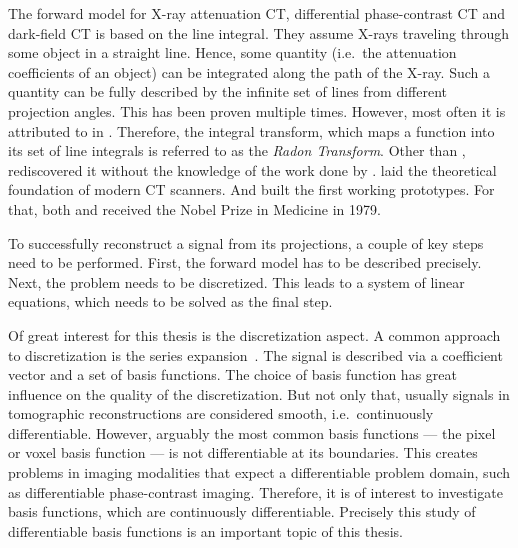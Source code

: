 The forward model for X-ray attenuation CT, differential phase-contrast CT and dark-field CT is
based on the line integral. They assume X-rays traveling through some object in a straight line.
Hence, some quantity (i.e.\ the attenuation coefficients of an object) can be integrated along the
path of the X-ray. Such a quantity can be fully described by the infinite set of lines from
different projection angles. This has been proven multiple times. However, most often it is
attributed to \textcite{radon_uber_1917} in \citeyear{radon_uber_1917}. Therefore, the integral
transform, which maps a function into its set of line integrals is referred to as the \textit{Radon
	Transform}. Other than \citeauthor*{radon_uber_1917}, \textcite*{cormack_representation_1963}
rediscovered it without the knowledge of the work done by \citeauthor*{radon_uber_1917}.
\citeauthor*{cormack_representation_1963} laid the theoretical foundation of modern CT scanners. And
\textcite{hounsfield_computerized_1973} built the first working prototypes. For that, both
\citeauthor*{cormack_representation_1963} and \citeauthor*{hounsfield_computerized_1973} received
the Nobel Prize in Medicine in 1979.

To successfully reconstruct a signal from its projections, a couple of key steps need to be
performed. First, the forward model has to be described precisely. Next, the problem needs to be
discretized. This leads to a system of linear equations, which needs to be solved as the final step.

Of great interest for this thesis is the discretization aspect. A common approach to discretization
is the series expansion~\cite{herman_basis_2015}. The signal is described via a coefficient vector
and a set of basis functions. The choice of basis function has great influence on the quality of the
discretization. But not only that, usually signals in tomographic reconstructions are considered
smooth, i.e.\ continuously differentiable. However, arguably the most common basis functions --- the
pixel or voxel basis function --- is not differentiable at its boundaries. This creates problems in
imaging modalities that expect a differentiable problem domain, such as differentiable
phase-contrast imaging. Therefore, it is of interest to investigate basis functions, which are
continuously differentiable. Precisely this study of differentiable basis functions is an important
topic of this thesis.

